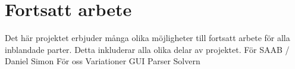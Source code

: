 \section{Fortsatt arbete}
Det här projektet erbjuder många olika möjligheter till fortsatt arbete för alla inblandade parter. Detta inkluderar alla olika delar av projektet. 
\newline \newline
För SAAB / Daniel Simon\newline
För oss \newline
Variationer \newline
GUI \newline
Parser \newline
Solvern \newline
